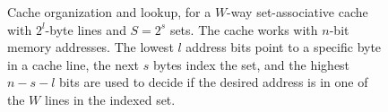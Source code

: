 \begin{figure}[hbt]
  \caption{
    Cache organization and lookup, for a $W$-way set-associative cache with
    $2^{l}$-byte lines and $S = 2^{s}$ sets. The cache works with $n$-bit
    memory addresses. The lowest $l$ address bits point to a specific byte in a
    cache line, the next $s$ bytes index the set, and the highest $n - s - l$
    bits are used to decide if the desired address is in one of the $W$ lines
    in the indexed set.
  }
  \label{fig:cpu_cache}
\end{figure}
